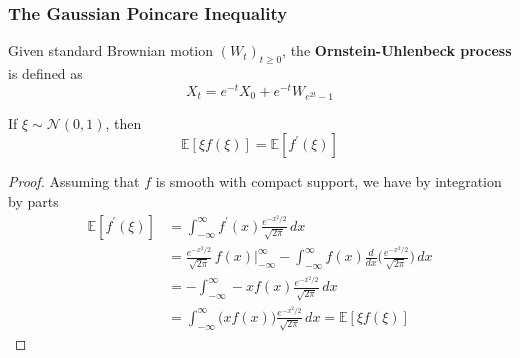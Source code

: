\subsubsection{The Gaussian Poincare Inequality}

  \begin{definition}
  Given standard Brownian motion $(W_t)_{t \geq 0}$, the \textbf{Ornstein-Uhlenbeck process} is defined as 
  \[X_t = e^{-t} X_0 + e^{-t} W_{e^{2t} - 1}\]
  \end{definition}

  \begin{lemma}
  If $\xi \sim \mathcal{N}(0, 1)$, then 
  \[\mathbb{E}[ \xi f(\xi)] = \mathbb{E}[f^\prime (\xi)]\]
  \end{lemma}
  \begin{proof}
  Assuming that $f$ is smooth with compact support, we have by integration by parts 
  \begin{align*}
      \mathbb{E}[f^\prime (\xi)] & = \int_{-\infty}^\infty f^\prime(x) \frac{e^{-x^2 / 2}}{\sqrt{2\pi}} \,dx \\ 
      & = \frac{e^{-x^2 / 2}}{\sqrt{2\pi}} \, f(x) \bigg|_{-\infty}^\infty - \int_{-\infty}^\infty f(x) \frac{d}{dx} \bigg(\frac{e^{-x^2 / 2}}{\sqrt{2\pi}}\bigg) \,dx \\
      & = - \int_{-\infty}^\infty -x f(x) \frac{e^{-x^2 / 2}}{\sqrt{2\pi}} \,dx \\
      & = \int_{-\infty}^\infty \big( x f(x)\big) \frac{e^{-x^2 / 2}}{\sqrt{2\pi}}\,dx = \mathbb{E}[\xi f(\xi)]
  \end{align*}
  \end{proof}

